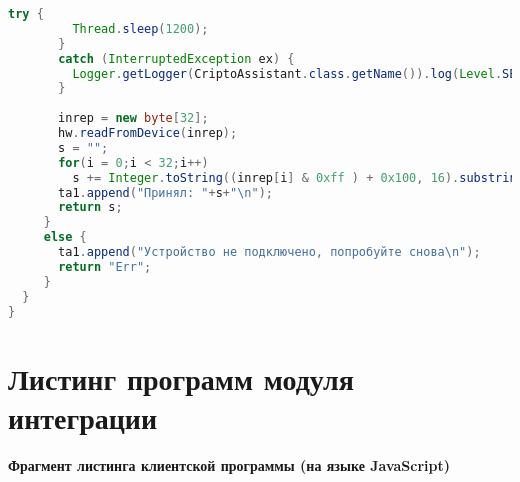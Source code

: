 {\begin{lstlisting}[language=Java]
       try {
         Thread.sleep(1200);
       } 
       catch (InterruptedException ex) {
         Logger.getLogger(CriptoAssistant.class.getName()).log(Level.SEVERE, null, ex);
       }
                   
       inrep = new byte[32];  
       hw.readFromDevice(inrep);
       s = "";
       for(i = 0;i < 32;i++)
         s += Integer.toString((inrep[i] & 0xff ) + 0x100, 16).substring(1);
       ta1.append("Принял: "+s+"\n");
       return s;
     }
     else {
       ta1.append("Устройство не подключено, попробуйте снова\n");
       return "Err";
     }
  }
}

\end{lstlisting}}



\chapter{Листинг программ модуля интеграции}
\label{pril:C}
\textbf{Фрагмент листинга клиентской программы (на языке JavaScript)}
